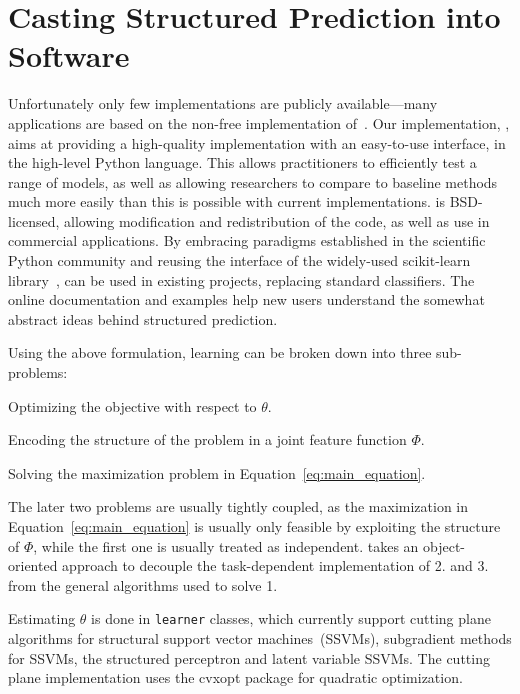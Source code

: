 \section{Casting Structured Prediction into Software}\label{sec:api}
Unfortunately only few implementations are publicly
available---many applications are based on the non-free implementation
of~\citet{joachims2009cutting}.
Our implementation, \pystruct, aims at providing a high-quality implementation
with an easy-to-use interface, in the high-level Python language.  This allows
practitioners to efficiently test a range of models, as well as allowing
researchers to compare to baseline methods much more easily than this is
possible with current implementations.  \pystruct is BSD-licensed, allowing
modification and redistribution of the code, as well as use in commercial
applications.  By embracing paradigms established in the scientific Python
community and reusing the interface of the widely-used {\sc scikit-learn}
library~\citep{pedregosa2011scikit}, \pystruct can be used in existing
projects, replacing standard classifiers.  The online documentation and
examples help new users understand the somewhat abstract ideas behind
structured prediction.

Using the above formulation, learning can be broken down into three sub-problems:
\begin{enumerate*}
    \item Optimizing the objective with respect to $\theta$.
    \item Encoding the structure of the problem in a joint feature function $\Phi$.
    \item Solving the maximization problem in Equation~\ref{eq:main_equation}.
\end{enumerate*}
The later two problems are usually tightly coupled, as the maximization in
Equation~\ref{eq:main_equation} is usually only feasible by exploiting the
structure of $\Phi$, while the first one is usually treated as independent.
\pystruct takes an object-oriented approach to decouple the task-dependent
implementation of 2. and 3. from the general algorithms used to solve 1.

Estimating $\theta$ is done in \texttt{learner} classes, which currently
support cutting plane algorithms for structural support vector
machines~(SSVMs), subgradient methods for SSVMs, the structured perceptron and
latent variable SSVMs. The cutting plane implementation uses the {\sc cvxopt}
package \citep{dahl2006cvxopt} for quadratic optimization.

